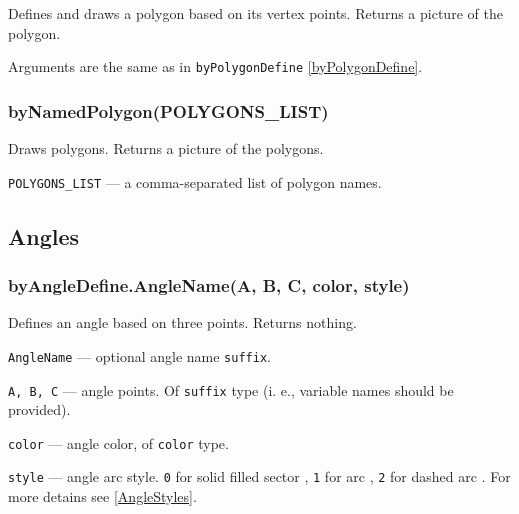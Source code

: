 \documentclass{ltxdoc}
\begin{document}
	Defines and draws a polygon based on its vertex points. Returns a picture of the polygon.
	
	Arguments are the same as in \texttt{byPolygonDefine} \ref{byPolygonDefine}.



\subsubsection{byNamedPolygon(POLYGONS\_LIST)}\label{byNamedPolygon}
	
	Draws polygons. Returns a picture of the polygons.
	
	\texttt{POLYGONS\_LIST} — a comma-separated list of polygon names.


\subsection{Angles}

\subsubsection{byAngleDefine.AngleName(A, B, C, color, style)}\label{byAngleDefine}
	
	
	Defines an angle based on three points. Returns nothing.

	\texttt{AngleName} — optional angle name \texttt{suffix}.
		
	\texttt{A, B, C} — angle points. Of \texttt{suffix} type (i. e., variable names should be provided).
	
	\texttt{color} — angle color, of \texttt{color} type.
	
	\texttt{style} — angle arc style. \texttt{0} for solid filled sector , \texttt{1} for arc , \texttt{2} for dashed arc . For more detains see \ref{AngleStyles}. 

\end{document}
